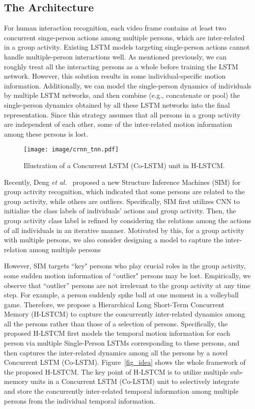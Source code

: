 \documentclass[9pt,journal,letterpaper,twocolumn]{IEEEtran}
\begin{document}
	\subsection{The Architecture}
	For human interaction recognition, each video frame
	contains at least two concurrent singe-person actions among multiple persons, which are inter-related in a group activity. Existing LSTM models targeting single-person actions cannot handle multiple-person interactions well. As mentioned previously, we can roughly treat all the interacting persons as a whole before training the LSTM network. However, this solution results in some individual-specific motion information. Additionally, we can model the single-person dynamics of individuals by multiple LSTM networks, and then combine (e.g., concatenate or pool) the single-person dynamics obtained by all these LSTM networks into the final representation. Since this strategy assumes that all persons in a group activity are independent of each other, some of the inter-related motion information among these persons is lost.
	\begin{figure}[t]
		\centering
		\texttt{[image: image/crnn\_tnn.pdf]}
		\vspace{-1mm}
		\caption{Illustration of a Concurrent LSTM (Co-LSTM) unit in H-LSTCM.}
		\label{fig_crnn}
		\vspace{-3mm}
	\end{figure}
	
	{
		
		
		Recently, Deng {\em et al.}~\cite{deng2016structure} proposed a new Structure Inference Machines (SIM) for group activity recognition, which indicated that some persons are related to the group activity, while others are outliers. Specifically, SIM first utilizes CNN to initialize the class labels of individuals' actions and group activity. Then, the group activity class label is refined by considering the relations among the actions of all individuals in an iterative manner. Motivated by this, for a group activity with multiple persons, we also consider designing a model to capture the inter-relation among multiple persons 
		
		However, SIM targets ``key" persons who play crucial roles in the group activity, some sudden motion information of ``outlier" persons may be lost. Empirically, we observe that “outlier” persons are not irrelevant to the group activity at any time step. For example, a person suddenly spike ball at one moment in a volleyball game. Therefore, we propose a Hierarchical Long Short-Term Concurrent Memory (H-LSTCM) to capture the concurrently inter-related dynamics among all the persons rather than those of a selection of persons. Specifically, the proposed H-LSTCM first models the temporal motion information for each person via multiple Single-Person LSTMs corresponding to these persons, and then captures the inter-related dynamics among all the persons by a novel Concurrent LSTM (Co-LSTM). Figure~\ref{fig_idea} shows the whole framework of the proposed H-LSTCM. The key point of H-LSTCM is to utilize multiple sub-memory units in a Concurrent LSTM (Co-LSTM) unit to selectively integrate and store the concurrently inter-related temporal information among multiple persons from the individual temporal information. }
	
\end{document}
